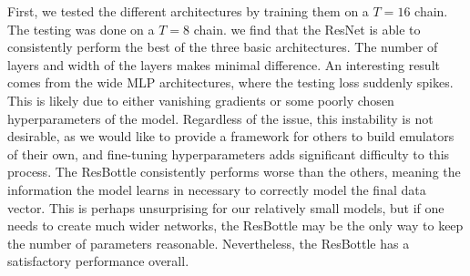 First, we tested the different architectures by training them on a $T=16$ chain. The testing was done on a $T=8$ chain. we find that the ResNet is able to consistently perform the best of the three basic architectures. The number of layers and width of the layers makes minimal difference. An interesting result comes from the wide MLP architectures, where the testing loss suddenly spikes. This is likely due to either vanishing gradients or some poorly chosen hyperparameters of the model. Regardless of the issue, this instability is not desirable, as we would like to provide a framework for others to build emulators of their own, and fine-tuning hyperparameters adds significant difficulty to this process. The ResBottle consistently performs worse than the others, meaning the information the model learns in necessary to correctly model the final data vector. This is perhaps unsurprising for our relatively small models, but if one needs to create much wider networks, the ResBottle may be the only way to keep the number of parameters reasonable. Nevertheless, the ResBottle has a satisfactory performance overall.
